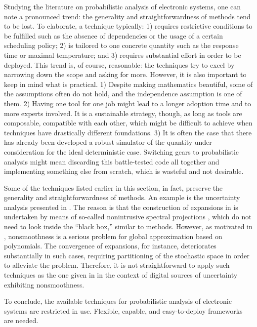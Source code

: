 Studying the literature on probabilistic analysis of electronic systems, one can
note a pronounced trend: the generality and straightforwardness of 
methods tend to be lost. To elaborate, a technique typically: 1) requires
restrictive conditions to be fulfilled such as the absence of dependencies or
the usage of a certain scheduling policy; 2) is tailored to one concrete
quantity such as the response time or maximal temperature; and 3) requires
substantial effort in order to be deployed. This trend is, of course,
reasonable: the techniques try to excel by narrowing down the scope and asking
for more. However, it is also important to keep in mind what is practical. 1)
Despite making mathematics beautiful, some of the assumptions often do not hold,
and the independence assumption is one of them. 2) Having one tool for one job
might lead to a longer adoption time and to more experts involved. It is a
sustainable strategy, though, as long as tools are composable, compatible with
each other, which might be difficult to achieve when techniques have drastically
different foundations. 3) It is often the case that there has already been
developed a robust simulator of the quantity under consideration for the ideal
deterministic case. Switching gears to probabilistic analysis might mean
discarding this battle-tested code all together and implementing something else
from scratch, which is wasteful and not desirable.

Some of the techniques listed earlier in this section, in fact, preserve the
generality and straightforwardness of  methods. An example is the
uncertainty analysis presented in \cite{ukhov2015}. The reason is that the
construction of  expansions in \cite{ukhov2015} is undertaken by means
of so-called nonintrusive spectral projections \cite{xiu2010}, which do not need
to look inside the ``black box,'' similar to  methods. However, as
motivated in , nonsmoothness is a serious problem for global
approximation based on polynomials. The convergence of  expansions, for
instance, deteriorates substantially in such cases, requiring partitioning of
the stochastic space in order to alleviate the problem. Therefore, it is not
straightforward to apply such techniques as the one given in \cite{ukhov2015} in
the context of digital sources of uncertainty exhibiting nonsmoothness.

To conclude, the available techniques for probabilistic analysis of electronic
systems are restricted in use. Flexible, capable, and easy-to-deploy frameworks
are needed.
